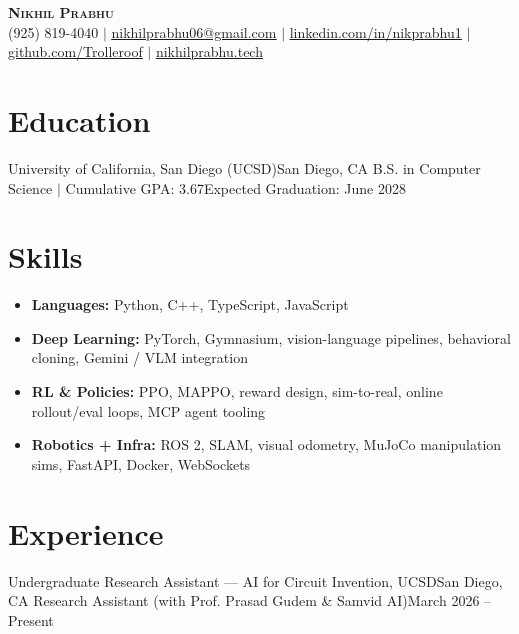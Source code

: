 




\begin{center}
    \textbf{\Large \scshape Nikhil Prabhu} \\ \vspace{1pt}
    \small (925) 819-4040 $|$ \href{mailto:nikhilprabhu06@gmail.com}{\underline{nikhilprabhu06@gmail.com}} $|$ 
    \href{https://www.linkedin.com/in/nikprabhu1/}{\underline{linkedin.com/in/nikprabhu1}} $|$
    \href{https://github.com/Trolleroof}{\underline{github.com/Trolleroof}} $|$
    \href{https://nikhilprabhu.tech}{\underline{nikhilprabhu.tech}}
\end{center}
\small

\section{Education}
  \resumeSubHeadingListStart
    \resumeSubheading
      {University of California, San Diego (UCSD)}{San Diego, CA}
      {B.S. in Computer Science $|$ Cumulative GPA: 3.67}{Expected Graduation: June 2028}
  \resumeSubHeadingListEnd
\vspace{-4pt}

\section{Skills}
\begin{itemize}[leftmargin=0.15in, label={}, nosep, topsep=2pt, itemsep=3pt, parsep=0pt]
  \item \textbf{Languages:} Python, C++, TypeScript, JavaScript
  \item \textbf{Deep Learning:} PyTorch, Gymnasium, vision-language pipelines, behavioral cloning, Gemini / VLM integration
  \item \textbf{RL \& Policies:} PPO, MAPPO, reward design, sim-to-real, online rollout/eval loops, MCP agent tooling
  \item \textbf{Robotics + Infra:} ROS 2, SLAM, visual odometry, MuJoCo manipulation sims, FastAPI, Docker, WebSockets
\end{itemize}
\vspace{-4pt}

\section{Experience}
  \resumeSubHeadingListStart

    \resumeSubheading
      {Undergraduate Research Assistant --- AI for Circuit Invention, UCSD}{San Diego, CA}
      {Research Assistant (with Prof. Prasad Gudem \& Samvid AI)}{March 2026 -- Present}
      \resumeItemListStart
      \resumeItemListEnd


